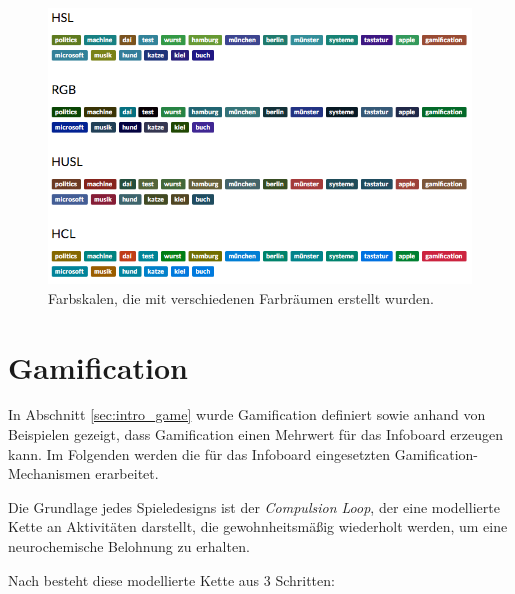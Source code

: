 \documentclass[12pt,twoside]{book}
\begin{document}
\begin{figure}[htbp]
    \centering
    \includegraphics[width=1.0\textwidth]{images/colors}
    \caption{Farbskalen, die mit verschiedenen Farbräumen erstellt wurden.}
    \label{fig:colors}
\end{figure}

\section{Gamification}


In Abschnitt \ref{sec:intro_game} wurde Gamification definiert sowie anhand von Beispielen gezeigt, dass Gamification einen Mehrwert für das Infoboard erzeugen kann. Im Folgenden werden die für das Infoboard eingesetzten Gamification-Mechanismen erarbeitet.

Die Grundlage jedes Spieledesigns ist der \textit{Compulsion Loop}, der eine modellierte Kette an Aktivitäten darstellt, die gewohnheitsmäßig wiederholt werden, um eine neurochemische Belohnung zu erhalten.

Nach \citep{gamasutra} besteht diese modellierte Kette aus 3 Schritten:
\end{document}
